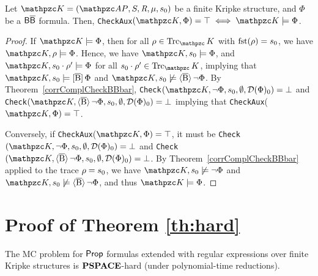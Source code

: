 \begin{theorem*}[\ref{corrCheckAux}]
    Let $\Ku=\KuDef$ be a finite Kripke structure, and $\Phi$ be a $\mathsf{B}\mathsf{\overline{B}}$ formula. Then, \texttt{CheckAux}$(\Ku,\Phi)=\top\iff\Ku\models\Phi$.
\end{theorem*}

\begin{proof}
    If $\Ku\models\Phi$, then for all $\rho\in\Trk_\Ku$ with $\operatorname{fst}(\rho)=s_0$, we have $\Ku,\rho\models\Phi$. Hence, we have $\Ku,\sinit\models\Phi$, and $\Ku,\sinit\cdot\rho'\models\Phi$ for all $\sinit\cdot\rho'\in\Trk_\Ku$, implying that $\Ku,\sinit\models\hsBtu\Phi$ and $\Ku,\sinit\not\models\hsBt\neg\Phi$. By Theorem~\ref{corrComplCheckBBbar}, \texttt{Check}$(\Ku,\neg\Phi,\sinit,\emptyset,\Du(\Phi)_0)=\bot$ and  \texttt{Check}$(\Ku,\hsBt\neg\Phi,\sinit,\emptyset,\Du(\Phi)_0)=\bot$ implying that \texttt{CheckAux}($\Ku,\Phi)=\top$.
   
    Conversely, if \texttt{CheckAux}($\Ku,\Phi) = \top$, it must be \texttt{Check}$(\Ku,\neg\Phi,\sinit,\emptyset,\Du(\Phi)_0)=\bot$ and  \texttt{Check}$(\Ku,\hsBt\neg\Phi,\sinit,\emptyset,\Du(\Phi)_0)=\bot$. By Theorem~\ref{corrComplCheckBBbar} applied to the trace $\rho=s_0$, we have $\Ku,\sinit\not\models\neg\Phi$ and $\Ku,\sinit\not\models\hsBt\neg\Phi$, and thus $\Ku\models\Phi$.
\end{proof}


\section{Proof of Theorem \ref{th:hard}}\label{sec:th:hard}

\begin{theorem*}[\ref{th:hard}]
The MC problem for $\mathsf{Prop}$ formulas extended with regular expressions over finite Kripke structures is $\textbf{PSPACE}$-hard (under polynomial-time reductions).
\end{theorem*}

